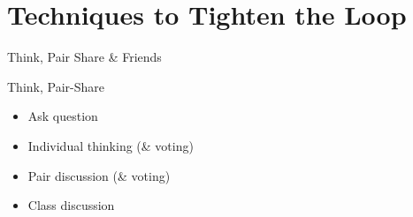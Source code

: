 \documentclass[10pt, aspectratio=169, t]{beamer}
\begin{document}

\section{Techniques to Tighten the Loop}


\begin{frame}{Think, Pair Share \& Friends}

	\vfill

	\begin{block}{\Large Think, Pair-Share}
		\Large
		\begin{itemize}
			\item Ask question
			\item Individual thinking (\& voting)
			\item Pair discussion (\& voting)
			\item Class discussion
		\end{itemize}
	\end{block}

\end{frame}
\end{document}
